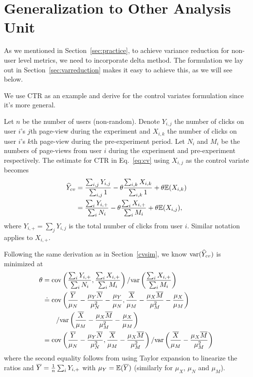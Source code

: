 \documentclass{sig-alternate}
\begin{document}
\section{Generalization to Other Analysis Unit}\label{appendix:deltamethod}
As we mentioned in Section~\ref{sec:practice}, to achieve variance reduction for non-user level metrics, we need to incorporate delta method. The formulation we lay out in Section~\ref{sec:varreduction} makes it easy to achieve this, as we will see below. 
  
We use CTR as an example and derive for the control variates formulation since it's more general. 

Let $n$ be the number of users (non-random). Denote $Y_{i,j}$ the number of clicks on user $i$'s $j$th page-view during the experiment and $X_{i,k}$ the number of clicks on user $i$'s $k$th page-view during the pre-experiment period.  
Let $N_{i}$ and $M_{i}$ be the numbers of page-views from user $i$ during the experiment and pre-experiment respectively. The estimate for CTR in Eq.~\eqref{eq:cv} using $X_{i,j}$ as the control variate  becomes
\begin{align*}
\widehat{Y}_{cv}&=\frac{\sum_{i,j}Y_{i,j}}{\sum_{i,j}1}-\theta\frac{\sum_{i,k}X_{i,k}}{\sum_{i,k}1}+\theta\mathbb{E}(X_{i,k})\\
&=\frac{\sum_{i}Y_{i,+}}{\sum_{i}N_i}-\theta\frac{\sum_{i}X_{i,+}}{\sum_{i}M_i}+\theta\mathbb{E}(X_{i,j}),
\end{align*}
where $Y_{i,+}=\sum_jY_{i,j}$ is the total number of clicks from user $i$. Similar notation applies to $X_{i,+}$.

Following the same derivation as in Section~\ref{cvsim}, we know $\mathrm{var}(\widehat{Y}_{cv})$ is minimized at
\begin{align}
\theta&=\mathrm{cov}\left(\frac{\sum_{i}Y_{i,+}}{\sum_{i}N_i},\frac{\sum_{i}X_{i,+}}{\sum_{i}M_i}\right)/\mathrm{var}\left(\frac{\sum_{i}X_{i,+}}{\sum_{i}M_i}\right)\nonumber\\
&\doteq\mathrm{cov}\left(\frac{\overline{Y}}{\mu_N}-\frac{\mu_Y\overline{N}}{\mu_N^2}-\frac{\mu_Y}{\mu_N}, \frac{\overline{X}}{\mu_M}-\frac{\mu_X\overline{M}}{\mu_M^2}-\frac{\mu_X}{\mu_M}\right)\nonumber\\
 &\qquad /\mathrm{var}\left(\frac{\overline{X}}{\mu_M}-\frac{\mu_X\overline{M}}{\mu_M^2}-\frac{\mu_X}{\mu_M}\right)\nonumber\\
& = \mathrm{cov}\left(\frac{\overline{Y}}{\mu_N}-\frac{\mu_Y\overline{N}}{\mu_N^2}, \frac{\overline{X}}{\mu_M}-\frac{\mu_X\overline{M}}{\mu_M^2}\right)/\mathrm{var}\left(\frac{\overline{X}}{\mu_M}-\frac{\mu_X\overline{M}}{\mu_M^2}\right)\label{eq:thetaDelta}
\end{align} 
where the second equality follows from using Taylor expansion to linearize the ratios and $\overline{Y}=\frac{1}{n}\sum_{i}Y_{i,+}$ with $\mu_Y=\mathbb{E}(\overline{Y})$ (similarly for $\mu_X$, $\mu_N$ and $\mu_M$). 
\end{document}
